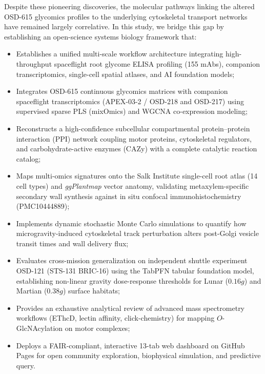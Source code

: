 Despite these pioneering discoveries, the molecular pathways linking the altered OSD-615 glycomics profiles to the underlying cytoskeletal transport networks have remained largely correlative. In this study, we bridge this gap by establishing an open-science systems biology framework that:
\begin{itemize}
    \item Establishes a unified multi-scale workflow architecture integrating high-throughput spaceflight root glycome ELISA profiling (155 mAbs), companion transcriptomics, single-cell spatial atlases, and AI foundation models;
    \item Integrates OSD-615 continuous glycomics matrices with companion spaceflight transcriptomics (APEX-03-2 / OSD-218 and OSD-217) using supervised sparse PLS (mixOmics) and WGCNA co-expression modeling;
    \item Reconstructs a high-confidence subcellular compartmental protein--protein interaction (PPI) network coupling motor proteins, cytoskeletal regulators, and carbohydrate-active enzymes (CAZy) with a complete catalytic reaction catalog;
    \item Maps multi-omics signatures onto the Salk Institute single-cell root atlas (14 cell types) and \textit{ggPlantmap} vector anatomy, validating metaxylem-specific secondary wall synthesis against in situ confocal immunohistochemistry (PMC10444889);
    \item Implements dynamic stochastic Monte Carlo simulations to quantify how microgravity-induced cytoskeletal track perturbation alters post-Golgi vesicle transit times and wall delivery flux;
    \item Evaluates cross-mission generalization on independent shuttle experiment OSD-121 (STS-131 BRIC-16) using the TabPFN tabular foundation model, establishing non-linear gravity dose-response thresholds for Lunar ($0.16g$) and Martian ($0.38g$) surface habitats;
    \item Provides an exhaustive analytical review of advanced mass spectrometry workflows (EThcD, lectin affinity, click-chemistry) for mapping $O$-GlcNAcylation on motor complexes;
    \item Deploys a FAIR-compliant, interactive 13-tab web dashboard on GitHub Pages for open community exploration, biophysical simulation, and predictive query.
\end{itemize}
